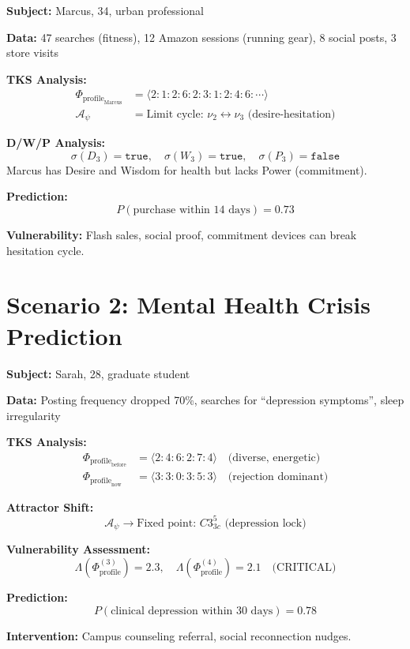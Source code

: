 \documentclass[11pt,twoside]{book}
\theoremstyle{definition}
\theoremstyle{plain}
\theoremstyle{remark}
\newcommand{\noe}[1]{\nu_{#1}}
\newcommand{\PsychAttractor}{\mathcal{A}_\psi}
\newcommand{\Lacunarity}{\Lambda}
\newcommand{\ProfileFrac}{\Phi_{\mathrm{profile}}}
\begin{document}
\begin{tcolorbox}[colback=yellow!5!white,colframe=yellow!65!black,title=\textbf{Scenario: Predicting Marcus's Next Purchase},breakable]

\textbf{Subject:} Marcus, 34, urban professional

\textbf{Data:} 47 searches (fitness), 12 Amazon sessions (running gear), 8 social posts, 3 store visits

\textbf{TKS Analysis:}
\begin{align*}
    \ProfileFrac_{\mathrm{Marcus}} &= \langle 2:1:2:6:2:3:1:2:4:6:\cdots \rangle \\
    \PsychAttractor &= \text{Limit cycle: } \noe{2} \leftrightarrow \noe{3} \text{ (desire-hesitation)}
\end{align*}

\textbf{D/W/P Analysis:}
\[
    \sigma(D_3) = \mathtt{true}, \quad \sigma(W_3) = \mathtt{true}, \quad \sigma(P_3) = \mathtt{false}
\]
Marcus has Desire and Wisdom for health but lacks Power (commitment).

\textbf{Prediction:}
\[
    P(\text{purchase within 14 days}) = 0.73
\]

\textbf{Vulnerability:} Flash sales, social proof, commitment devices can break hesitation cycle.

\end{tcolorbox}

\section{Scenario 2: Mental Health Crisis Prediction}

\begin{tcolorbox}[colback=yellow!5!white,colframe=yellow!65!black,title=\textbf{Scenario: Early Detection of Sarah's Crisis},breakable]

\textbf{Subject:} Sarah, 28, graduate student

\textbf{Data:} Posting frequency dropped 70\%, searches for ``depression symptoms'', sleep irregularity

\textbf{TKS Analysis:}
\begin{align*}
    \ProfileFrac_{\mathrm{before}} &= \langle 2:4:6:2:7:4 \rangle \quad \text{(diverse, energetic)} \\
    \ProfileFrac_{\mathrm{now}} &= \langle 3:3:0:3:5:3 \rangle \quad \text{(rejection dominant)}
\end{align*}

\textbf{Attractor Shift:}
\[
    \PsychAttractor \to \text{Fixed point: } C3^5_{3c} \text{ (depression lock)}
\]

\textbf{Vulnerability Assessment:}
\[
    \Lacunarity(\ProfileFrac^{(3)}) = 2.3, \quad \Lacunarity(\ProfileFrac^{(4)}) = 2.1 \quad \text{(CRITICAL)}
\]

\textbf{Prediction:}
\[
    P(\text{clinical depression within 30 days}) = 0.78
\]

\textbf{Intervention:} Campus counseling referral, social reconnection nudges.

\end{tcolorbox}
\end{document}
